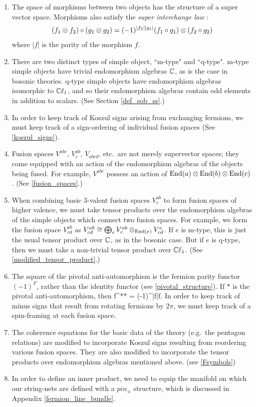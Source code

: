 \begin{enumerate}
	\item The space of morphisms between two objects has the structure of 
	a super vector space.
	Morphisms also satisfy the {\em super interchange law} \cite{brundan2016}:
	\begin{align}
	(f_1\otimes f_2) \circ (g_1\otimes g_2) = (-1)^{|f_2| |g_1|} (f_1\circ g_1)\otimes (f_2\circ g_2)
	\end{align}
	where $|f|$ is the parity of the morphism $f$. 
	\item There are two distinct types of simple object, ``m-type" and ``q-type".
	m-type simple objects have trivial endomorphism algebras $\mathbb{C}$, as is the case in bosonic theories.  
	q-type simple objects have endomorphism algebras isomorphic to $\mathbb{C}\ell_1$, 
	and so their endomorphism algebras contain odd elements in addition to scalars. (See Section \ref{def_sob_ss}.)
	\item In order to keep track of Koszul signs arising from exchanging fermions, 
	we must keep track of a sign-ordering of individual fusion spaces (See \ref{koszul_signs}).
	\item Fusion spaces $V^{abc}$, $V^{ab}_c$, $V_{abcd}$, etc.\ are not merely supervector spaces; they come equipped with an action of the
	endomorphism algebras of the objects being fused. 
	For example, $V^{abc}$ possess an action of $\text{End}(a)\otimes \text{End}(b)\otimes \text{End}(c)$.
	(See \ref{fusion_spaces}.)
	\item When combining basic 3-valent fusion spaces $V^{ab}_c$ to form fusion spaces of higher valence, we must take
	tensor products over the endomorphism algebras of the simple objects which connect two fusion spaces. 
	For example, we form the fusion space $V^{ab}_{cd}$ as $V^{ab}_{cd} \cong \bigoplus_e V^{ab}_e \otimes_{\text{End}(e)} V^e_{cd}$.
	If $e$ is m-type, this is just the usual tensor product over $\mathbb{C}$, as in the bosonic case.
	But if $e$ is q-type, then we must take a non-trivial tensor product over $\mathbb{C}\ell_1$.
	(See \ref{modified_tensor_product}.)
	\item The square of the pivotal anti-automorphism is 
	the fermion parity functor $(-1)^F$, rather than the identity functor (see \ref{pivotal_structure}). 
	If $*$ is the pivotal anti-automorphism, then 
	\be f^{**} = (-1)^{|f|}f.\ee
	In order to keep track of minus signs that result from rotating fermions by $2\pi$, we must keep track of a spin-framing at each fusion space. 
	\item The coherence equations for the basic data of the theory (e.g.\ the pentagon relations) are modified to incorporate  
	 Koszul signs resulting from reordering various fusion spaces. 
	 They are also modified to incorporate the tensor products over endomorphism algebras mentioned above. (see \ref{Fsymbols})
	\item In order to define an inner product, we need to equip the manifold on which our string-nets are 
	defined with a $pin_\pm$ structure, which is discussed in Appendix \ref{fermion_line_bundle}.
\end{enumerate}

